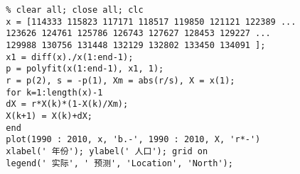 \documentclass[oneside]{ctexart}
\begin{document}
\begin{lstlisting}
  % clear all; close all; clc
  x = [114333 115823 117171 118517 119850 121121 122389 ...
  123626 124761 125786 126743 127627 128453 129227 ...
  129988 130756 131448 132129 132802 133450 134091 ];
  x1 = diff(x)./x(1:end-1);
  p = polyfit(x(1:end-1), x1, 1);
  r = p(2), s = -p(1), Xm = abs(r/s), X = x(1);
  for k=1:length(x)-1
  dX = r*X(k)*(1-X(k)/Xm);
  X(k+1) = X(k)+dX;
  end
  plot(1990 : 2010, x, 'b.-', 1990 : 2010, X, 'r*-')
  xlabel(' 年份'); ylabel(' 人口'); grid on
  legend(' 实际', ' 预测', 'Location', 'North');
\end{lstlisting}
\end{document}

